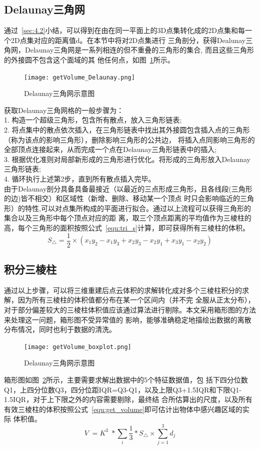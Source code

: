 \subsection{Delaunay三角网}
\label{sec:4.4.3}
通过~\ref{sec:4.2}小结，可以得到在由在同一平面上的3D点集转化成的2D点集和每一个2D点集对应的距离值d。在本节中将对2D点集进行
三角剖分，获得Dealunay三角网，Delaunay三角网是一系列相连的但不重叠的三角形的集合, 而且这些三角形的外接圆不包含这个面域的其
他任何点，如图~\ref{fig:getVolume_Delaunay}所示。
\begin{figure}[H] %
  \centering
  \texttt{[image: getVolume\_Delaunay.png]}
  \caption{Delaunay三角网示意图}
  \label{fig:getVolume_Delaunay}
\end{figure}
获取Delaunay三角网格的一般步骤为：\\
1.	构造一个超级三角形，包含所有散点，放入三角形链表;\\
2.	将点集中的散点依次插入，在三角形链表中找出其外接圆包含插入点的三角形（称为该点的影响三角形），删除影响三角形的公共边，
将插入点同影响三角形的全部顶点连接起来，从而完成一个点在Delaunay三角形链表中的插入;\\
3.	根据优化准则对局部新形成的三角形进行优化。将形成的三角形放入Delaunay三角形链表;\\
4.	循环执行上述第2步，直到所有散点插入完毕。\\
由于Delaunay剖分具备具备最接近（以最近的三点形成三角形，且各线段(三角形的边)皆不相交）和区域性（新增、删除、移动某一个顶点
时只会影响临近的三角形）的特性,可以对点集所构成的平面进行拟合。通过以上流程可以获得三角形的集合以及三角形中每个顶点对应的距
离，取三个顶点距离的平均值作为三棱柱的高，每个三角形的面积按照公式~\ref{equ:tri_s}计算，即可获得所有三棱柱的体积。
\begin{equation}
S_\bigtriangleup=\frac12\times\left(x_1y_2-x_1y_3+x_2y_3-x_2y_1+x_3y_1-x_2y_2\right)\label{equ:tri_s}
\end{equation}
\subsection{积分三棱柱}
\label{sec:4.4.4}
通过以上步骤，可以将三维重建后点云体积的求解转化成对多个三棱柱积分的求解，因为所有三棱柱的体积值都分布在某一个区间内（并不完
全服从正太分布），对于部分偏差较大的三棱柱体积值应该通过算法进行剔除。本文采用箱形图的方法来处理这一问题，箱形图不受异常值的
影响，能够准确稳定地描绘出数据的离散分布情况，同时也利于数据的清洗。
\begin{figure}[H] %
  \centering
  \texttt{[image: getVolume\_boxplot.png]}
  \caption{Delaunay三角网示意图}
  \label{fig:getVolume_boxplot}
\end{figure}
箱形图如图~\ref{fig:getVolume_boxplot}所示，主要需要求解出数据中的5个特征数据值，包
括下四分位数Q1，上四分位数Q3，四分位距IQR=Q3-Q1，以及上限Q3+1.5IQR和下限Q1-1.5IQR，对于上下限之外的内容需要剔除，最终结
合\label{sec:4.3}所估算出的尺度，以及所有有效三棱柱的体积按照公式~\ref{equ:get_volume}即可估计出物体中感兴趣区域的实际
体积值。
\begin{equation}
  V\;=K^3\;\ast\sum_i\frac13\ast S_\bigtriangleup\times\sum_{j=1}^3d_j\label{equ:get_volume}
\end{equation}
